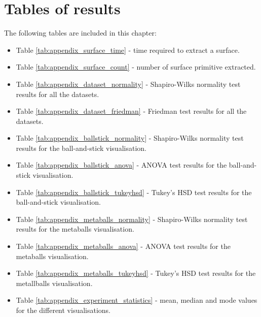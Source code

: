\chapter{Tables of results}
\label{cha:tables}

The following tables are included in this chapter:
\begin{itemize}

  \item Table \ref{tab:appendix_surface_time} - time required to extract a
  surface.

  \item Table \ref{tab:appendix_surface_count} - number of surface primitive
  extracted.

  \item Table \ref{tab:appendix_dataset_normality} - Shapiro-Wilks normality
  test results for all the datasets.

  \item Table \ref{tab:appendix_dataset_friedman} - Friedman test results for
  all the datasets.

  \item Table \ref{tab:appendix_ballstick_normality} - Shapiro-Wilks normality
  test results for the ball-and-stick visualisation.

  \item Table \ref{tab:appendix_ballstick_anova} - ANOVA test results for the
  ball-and-stick visualisation.

  \item Table \ref{tab:appendix_ballstick_tukeyhsd} - Tukey's HSD test results
  for the ball-and-stick visualisation.

  \item Table \ref{tab:appendix_metaballs_normality} - Shapiro-Wilks normality
  test results for the metaballs visualisation.

  \item Table \ref{tab:appendix_metaballs_anova} - ANOVA test results for the
  metaballs visualisation.

  \item Table \ref{tab:appendix_metaballs_tukeyhsd} - Tukey's HSD test results
  for the metallballs visualisation.

  \item Table \ref{tab:appendix_experiment_statistics} - mean, median and mode
  values for the different visualisations.

\end{itemize}

